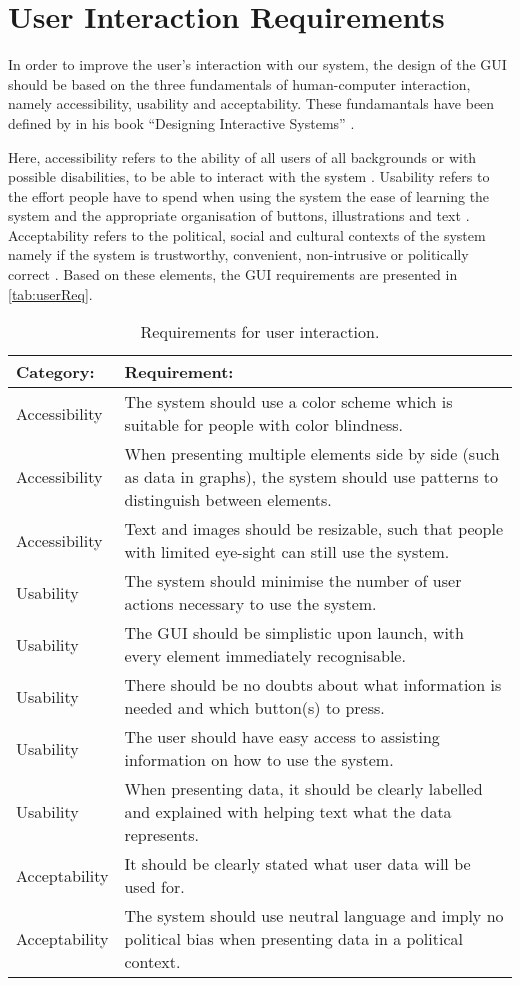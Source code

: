 \section{User Interaction Requirements}\label{sec:userReq}
In order to improve the user's interaction with our system, the design of the
\ac{GUI} should be based on the three fundamentals of human-computer
interaction, namely accessibility, usability and acceptability. These fundamantals have been defined by
\citeauthor{benyon2013designing} in his book ``Designing Interactive Systems''
\citep[ch. 4]{benyon2013designing}.\nl

Here, accessibility refers to the ability of all users of all backgrounds or
with possible disabilities, to be able to interact with the system
\citep[p. 77-80]{benyon2013designing}. Usability refers to the effort people
have to spend when using the system the ease of learning the system and the
appropriate organisation of buttons, illustrations and text \citep[p.
81-84]{benyon2013designing}. Acceptability refers to the political, social and
cultural contexts of the system namely if the system is trustworthy, convenient,
non-intrusive or politically correct \citep[p. 84-85]{benyon2013designing}.
Based on these elements, the GUI requirements are presented in
\autoref{tab:userReq}.

\begin{table}[H]\centering
\begin{tabular}{|l|p{11cm}|}\hline
\textbf{Category:} & \textbf{Requirement:} \\\hline 
Accessibility  & The system should use a color scheme which is suitable for
people with color blindness.\\\hline 
Accessibility  & When presenting multiple elements side by side (such as data
in graphs), the system should use patterns to distinguish between
elements.\\\hline
Accessibility & Text and images should be resizable, such that people with
limited eye-sight can still use the system.\\\hline
Usability & The system should minimise the number of user actions necessary to
use the system. \\\hline 
Usability & The \ac{GUI} should be simplistic upon
launch, with every element
immediately recognisable. \\\hline
Usability & There should be no doubts about what information is needed and which
button(s) to press. \\\hline
Usability & The user should have easy access to assisting information on how to
use the system. \\\hline
Usability & When presenting data, it should be clearly labelled and explained
with helping text what the data represents.\\\hline
Acceptability & It should be clearly stated what user data will be used for.\\\hline
Acceptability & The system should use neutral language and imply no political
bias when presenting data in a political context.\\\hline
\end{tabular}
\caption{Requirements for user interaction.}
\label{tab:userReq}
\end{table}